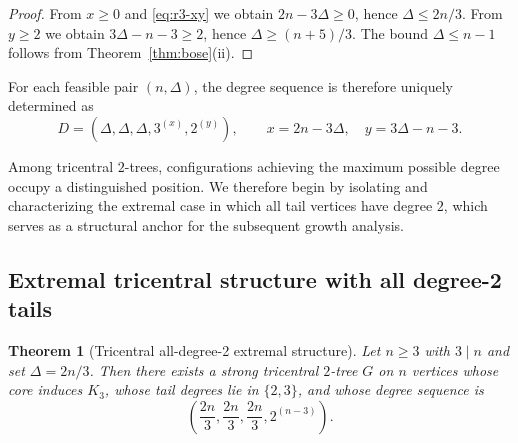 \documentclass[12pt]{article}
\newtheorem{theorem}{Theorem}[section]
\numberwithin{equation}{section}
\begin{document}
\begin{proof}
From $x \ge 0$ and \eqref{eq:r3-xy} we obtain $2n - 3\Delta \ge 0$, hence
$\Delta \le 2n/3$.
From $y \ge 2$ we obtain $3\Delta - n - 3 \ge 2$, hence $\Delta \ge (n+5)/3$.
The bound $\Delta \le n-1$ follows from Theorem~\ref{thm:bose}(ii).
\end{proof}

For each feasible pair $(n,\Delta)$, the degree sequence is therefore uniquely determined as
\[
D = (\Delta,\Delta,\Delta,3^{(x)},2^{(y)}),
\qquad
x = 2n - 3\Delta,
\quad
y = 3\Delta - n - 3.
\]


Among tricentral $2$-trees, configurations achieving the maximum possible degree occupy a distinguished position. We therefore begin by isolating and characterizing the extremal case in which all tail vertices have degree $2$, which serves as a structural anchor for the
subsequent growth analysis.

\subsection{Extremal tricentral structure with all degree-2 tails}
\begin{theorem}[Tricentral all-degree-2 extremal structure]
\label{thm:r3-extremal}
Let $n\ge 3$ with $3\mid n$ and set $\Delta=2n/3$.
Then there exists a strong tricentral $2$-tree $G$ on $n$ vertices whose core induces $K_3$, whose tail degrees lie in $\{2,3\}$, and whose degree sequence is
\[
\left(\frac{2n}{3},\frac{2n}{3},\frac{2n}{3},2^{(n-3)}\right).
\]
\end{theorem}
\end{document}
